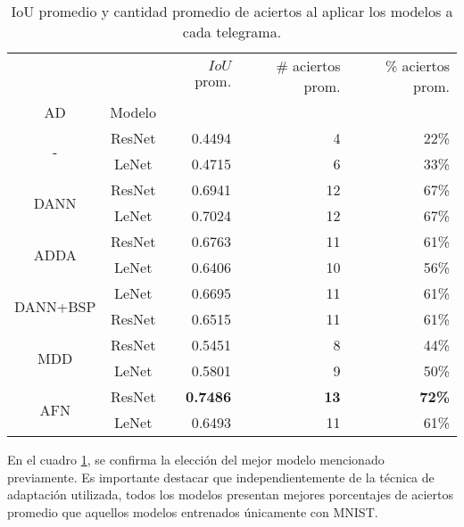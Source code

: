 \begin{table}[H]
    \centering
    \begin{tabular}{cc|rrr}
        \toprule
                                     &        & $IoU$ prom.     & \# aciertos prom. & \% aciertos prom. \\
        AD                           & Modelo &                 &                   &                   \\
        \midrule
        \multirow[c]{2}{*}{-}        & ResNet & 0.4494          & 4                 & 22\%              \\
                                     & LeNet  & 0.4715          & 6                 & 33\%              \\\hline
        \multirow[c]{2}{*}{DANN}     & ResNet & 0.6941          & 12                & 67\%              \\
                                     & LeNet  & 0.7024          & 12                & 67\%              \\\hline
        \multirow[c]{2}{*}{ADDA}     & ResNet & 0.6763          & 11                & 61\%              \\
                                     & LeNet  & 0.6406          & 10                & 56\%              \\\hline
        \multirow[c]{2}{*}{DANN+BSP} & LeNet  & 0.6695          & 11                & 61\%              \\
                                     & ResNet & 0.6515          & 11                & 61\%              \\\hline
        \multirow[c]{2}{*}{MDD}      & ResNet & 0.5451          & 8                 & 44\%              \\
                                     & LeNet  & 0.5801          & 9                 & 50\%              \\\hline
        \multirow[c]{2}{*}{AFN}      & ResNet & \textbf{0.7486} & \textbf{13}       & \textbf{72\%}     \\
                                     & LeNet  & 0.6493          & 11                & 61\%              \\
        \bottomrule
    \end{tabular}
    \caption{IoU promedio y cantidad promedio de aciertos al aplicar los modelos a cada telegrama.}
    \label{tab:iou-cant-aciertos-en-telegramas}
\end{table}

En el cuadro \ref{tab:iou-cant-aciertos-en-telegramas}, se confirma la elección del mejor modelo mencionado
previamente. Es importante destacar que independientemente de la técnica de adaptación utilizada, todos los modelos
presentan mejores porcentajes de aciertos promedio que aquellos modelos entrenados únicamente con MNIST.

